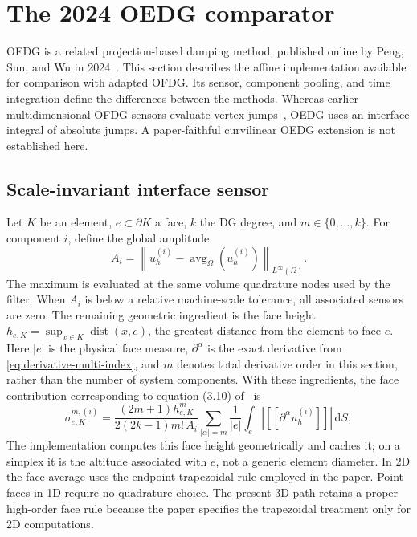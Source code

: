 \section{The 2024 OEDG comparator}
\label{chap:oedg}

OEDG is a related projection-based damping method, published online by Peng,
Sun, and Wu in 2024~\cite{PengEtAl2024}. This section describes the affine
implementation available for comparison with adapted OFDG. Its sensor,
component pooling, and time integration define the differences between the
methods. Whereas earlier multidimensional OFDG sensors evaluate vertex
jumps~\cite{LuEtAl2021,LiuEtAl2022}, OEDG uses an interface integral of absolute
jumps. A paper-faithful curvilinear OEDG extension is not established here.

\subsection{Scale-invariant interface sensor}

Let $K$ be an element, $e\subset\partial K$ a face, $k$ the DG degree, and
$m\in\{0,\ldots,k\}$.  For component $i$, define the global amplitude
\begin{equation}
  A_i = \left\|u_h^{(i)}-\operatorname{avg}_{\Omega}
                       (u_h^{(i)})\right\|_{L^\infty(\Omega)} .
  \label{eq:oedg-amplitude}
\end{equation}
The maximum is evaluated at the same volume quadrature nodes used by the
filter.  When $A_i$ is below a relative machine-scale tolerance, all associated
sensors are zero. The remaining geometric ingredient is the face height
$h_{e,K}=\sup_{x\in K}\operatorname{dist}(x,e)$, the greatest distance
from the element to face $e$. Here $|e|$ is the physical face measure,
$\partial^\alpha$ is the exact derivative from
\cref{eq:derivative-multi-index}, and $m$ denotes total derivative order in
this section, rather than the number of system components.
With these ingredients, the face contribution corresponding to equation
(3.10) of~\cite{PengEtAl2024} is
\begin{equation}
 \sigma^{m,(i)}_{e,K} =
 \frac{(2m+1)h_{e,K}^{m}}{2(2k-1)m!\,A_i}
 \sum_{|\alpha|=m}\frac{1}{|e|}
 \int_e \left|[\![\partial^\alpha u_h^{(i)}]\!]\right|\,\mathrm dS,
 \label{eq:oedg-face-sensor}
\end{equation}
The implementation
computes this face height geometrically and caches it; on a simplex it is the
altitude associated with $e$, not a generic element diameter.  In 2D the face
average uses the endpoint trapezoidal rule employed in the paper.  Point faces
in 1D require no quadrature choice.  The present 3D path retains a proper
high-order face rule because the paper specifies the trapezoidal treatment only
for 2D computations.

